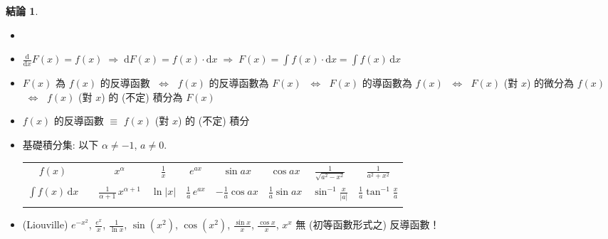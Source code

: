 \documentclass[12pt]{extarticle}
\newcommand{\ds}{\displaystyle}
\newcommand{\ie}{\;\Longrightarrow\;}
\newcommand{\ifff}{\;\Longleftrightarrow\;}
\theoremstyle{definition}
\newtheorem*{fact}{結論}
\begin{document}
\begin{fact}
  \begin{itemize}\setlength{\itemsep}{0pt}
    \item[]
    \item $\ds\frac{\text{d}}{\text{d}x} F(x) = f(x)\ie \text{d} F(x) = f(x)\cdot\text{d}x \ie F(x) = \int f(x)\cdot\text{d}x = \int f(x)\,\text{d}x$
    \item $F(x)$ 為 $f(x)$ 的反導函數 $\ifff$ $f(x)$ 的反導函數為 $F(x)$ $\ifff$ $F(x)$ 的導函數為 $f(x)$ $\ifff$ $F(x)$ (對 $x$) 的微分為 $f(x)$ $\ifff$ $f(x)$ (對 $x$) 的 (不定) 積分為 $F(x)$ 
    \item $f(x)$ 的反導函數 $\equiv$ $f(x)$ (對 $x$) 的 (不定) 積分
    \item 基礎積分集: 以下 $\ds\alpha\ne -1$, $a\ne 0$. 
      \begin{table}[!htbp]
        \centering
        \begin{tabular}{c|cccccccc}
          \toprule
          \addlinespace[2mm]
          $\ds f(x)$ & & $\ds x^\alpha$ & $\ds\frac{1}{x}$ & $\ds e^{a x}$ & $\ds\sin ax$ & $\ds\cos ax$ & $\ds\frac{1}{\sqrt{a^2 - x^2}}$ & $\ds\frac{1}{a^2 + x^2}$ \\
          \addlinespace[2mm]
          \midrule
          \addlinespace[2mm]
          $\ds \int f(x)\,\text{d}x$ & & $\ds\frac{1}{\alpha + 1}\,x^{\alpha + 1}$ & $\ds\ln |x|$ & $\ds\frac{1}{a}\,e^{a x}$ & $\ds-\frac{1}{a}\cos ax$ & $\ds\frac{1}{a}\sin ax$ & $\ds\sin^{-1}\frac{x}{|a|}$ & $\ds\frac{1}{a}\tan^{-1}\frac{x}{a}$ \\
          \addlinespace[2mm]
          \bottomrule
        \end{tabular}
      \end{table}
    \item (Liouville) {\color{M4} $\ds e^{-x^2}$, $\ds\frac{e^x}{x}$, $\ds\frac{1}{\ln x}$, $\ds\sin(x^2)$, $\ds\cos(x^2)$, $\ds\frac{\sin x}{x}$, $\ds\frac{\cos x}{x}$, $\ds x^x$ 無 (初等函數形式之) 反導函數！}
  \end{itemize}
\end{fact}
\end{document}
